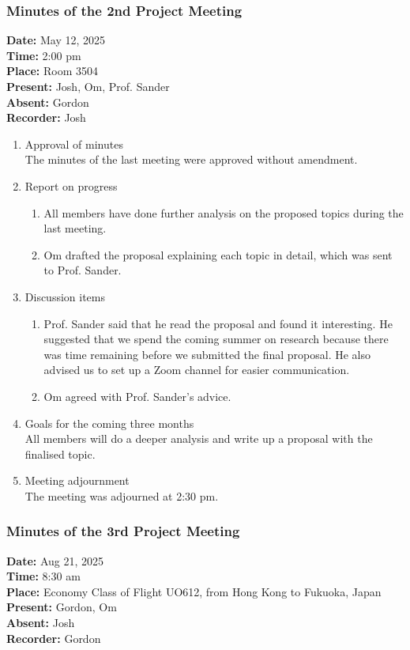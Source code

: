 \documentclass[12pt,a4paper]{article}
\begin{document}
\subsubsection{Minutes of the 2nd Project Meeting}
\textbf{Date:} May 12, 2025\\
\textbf{Time:} 2:00 pm\\
\textbf{Place:} Room 3504\\
\textbf{Present:} Josh, Om, Prof. Sander\\
\textbf{Absent:} Gordon\\
\textbf{Recorder:} Josh

\begin{enumerate}
\item Approval of minutes\\
The minutes of the last meeting were approved without amendment.\\
\item Report on progress
\begin{enumerate}
\item All members have done further analysis on the proposed topics during the last meeting.\\
\item Om drafted the proposal explaining each topic in detail, which was sent to Prof. Sander.\\
\end{enumerate}
\item Discussion items
\begin{enumerate}
\item Prof. Sander said that he read the proposal and found it interesting. He suggested that we spend the coming summer on research because there was time remaining before we submitted the final proposal. He also advised us to set up a Zoom channel for easier communication.\\
\item Om agreed with Prof. Sander's advice.\\
\end{enumerate}
\item Goals for the coming three months\\
All members will do a deeper analysis and write up a proposal with the finalised topic.\\
\item Meeting adjournment\\
The meeting was adjourned at 2:30 pm.
\end{enumerate}

\subsubsection{Minutes of the 3rd Project Meeting}
\textbf{Date:} Aug 21, 2025\\
\textbf{Time:} 8:30 am\\
\textbf{Place:} Economy Class of Flight UO612, from Hong Kong to Fukuoka, Japan\\
\textbf{Present:} Gordon, Om\\
\textbf{Absent:} Josh\\
\textbf{Recorder:} Gordon
\end{document}
